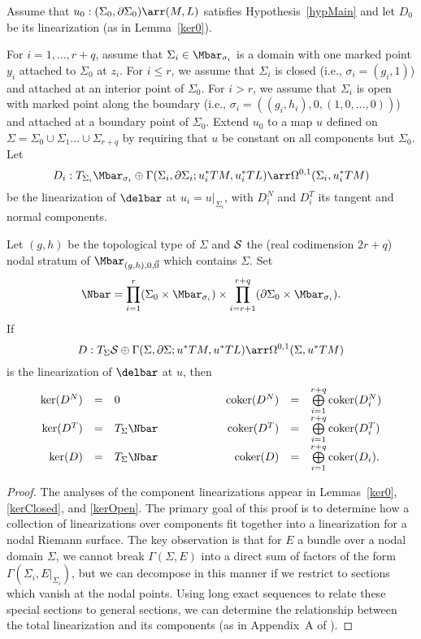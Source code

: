 \begin{proposition} \label{nodalLin}
Assume that $u_0:(\Sigma_0,\partial\Sigma_0)\arr(M,L)$ satisfies Hypothesis~\ref{hypMain} and let $D_0$ be its linearization (as in Lemma~\ref{ker0}).

For $i=1,\ldots,r+q$, assume that $\Sigma_i \in \Mbar_{\sigma_i}$ is a domain with one marked point $y_i$ attached to $\Sigma_0$ at $z_i$. For $i \leq r$, we assume that $\Sigma_i$ is closed (i.e., $\sigma_i=(g_i,1)$) and attached at an interior point of $\Sigma_0$. For $i>r$, we assume that $\Sigma_i$ is open with marked point along the boundary (i.e., $\sigma_i=((g_i,h_i),0,(1,0,\ldots,0))$) and attached at a boundary point of $\Sigma_0$. 
Extend $u_0$ to a map $u$ defined on $\Sigma=\Sigma_0 \cup \Sigma_1 \ldots \cup \Sigma_{r+q}$ by requiring that $u$ be constant on all components but $\Sigma_0$. 
Let
\[
D_i:T_{\Sigma_i}\Mbar_{\sigma_i} \oplus \Gamma(\Sigma_i,\partial\Sigma_i;u_i^*TM,u_i^*TL)\arr\Omega^{0,1}(\Sigma_i,u_i^*TM)
\]
be the linearization of $\delbar$ at $u_i=u|_{\Sigma_i}$, with $D_i^N$ and $D_i^T$ its tangent and normal components. 

Let $(g,h)$ be the topological type of $\Sigma$ and $\S$ the (real codimension $2r+q$) nodal stratum of $\Mbar_{(g,h),0,\vec{0}}$ which contains $\Sigma$. Set
\[
\Nbar = \prod\limits_{i=1}^{r} (\Sigma_0 \times \Mbar_{\sigma_i}) \times \prod\limits_{i=r+1}^{r+q} (\partial\Sigma_0\times\Mbar_{\sigma_i}).
\]
If
\[
D:T_\Sigma\S \oplus \Gamma(\Sigma,\partial\Sigma;u^*TM,u^*TL)\arr\Omega^{0,1}(\Sigma,u^*TM)
\]
is the linearization of $\delbar$ at $u$, then
\[
\begin{array}{rclcrcl}
\ker(D^N) & = & 0 & \qquad\qquad & \coker(D^N) & = & \bigoplus\limits_{i=1}^{r+q} \coker(D_i^N)
\\
\ker(D^T) & = & T_\Sigma\Nbar && \coker(D^T) & = & \bigoplus\limits_{i=1}^{r+q} \coker(D_i^T)
\\
\ker(D) & = & T_\Sigma\Nbar && \coker(D) & = & \bigoplus\limits_{i=1}^{r+q} \coker(D_i).
\end{array}
\]
\begin{proof}
The analyses of the component linearizations appear in Lemmas~\ref{ker0}, \ref{kerClosed}, and \ref{kerOpen}. The primary goal of this proof is to determine how a collection of linearizations over components fit together into a linearization for a nodal Riemann surface. The key observation is that for $E$ a bundle over a nodal domain $\Sigma$, we cannot break $\Gamma(\Sigma,E)$ into a direct sum of factors of the form $\Gamma(\Sigma_i,E|_{\Sigma_i})$, but we can decompose in this manner if we restrict to sections which vanish at the nodal points. Using long exact sequences to relate these special sections to general sections, we can determine the relationship between the total linearization and its components (as in Appendix~A of \cite{splitting}).


\end{proof}
\end{proposition}
